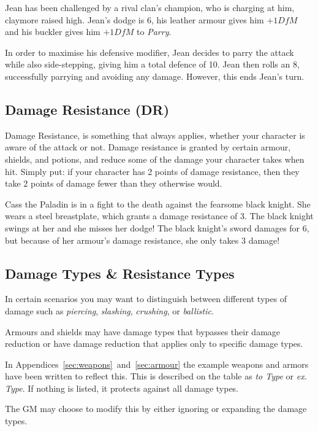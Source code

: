 \example Jean has been challenged by a rival clan's champion, who is charging at him, claymore raised high.
Jean's dodge is 6, his leather armour gives him $+1 \mathit{DfM}$ and his buckler gives him $+1 \mathit{DfM}$ to \textit{Parry}.

In order to maximise his defensive modifier, Jean decides to parry the attack while also side-stepping, giving him a total defence of 10.
Jean then rolls an 8, successfully parrying and avoiding any damage.
However, this ends Jean's turn.

\subsection{Damage Resistance (DR)}\label{sec:damage-resistance}
Damage Resistance, is something that always applies, whether your character is aware of the attack or not.
Damage resistance is granted by certain armour, shields, and potions, and reduce some of the damage your character takes when hit.
Simply put: if your character has 2 points of damage resistance, then they take 2 points of damage fewer than they otherwise would.

\example Cass the Paladin is in a fight to the death against the fearsome black knight.
She wears a steel breastplate, which grants a damage resistance of 3.
The black knight swings at her and she misses her dodge!
The black knight's sword damages for 6, but because of her armour's damage resistance, she only takes 3 damage!

\subsection{Damage Types \& Resistance Types}
In certain scenarios you may want to distinguish between different types of damage such as \textit{piercing}, \textit{slashing}, \textit{crushing}, or \textit{ballistic}.

Armours and shields may have damage types that bypasses their damage reduction or have damage reduction that applies only to specific damage types.

In Appendices~\ref{sec:weapons}~and~\ref{sec:armour} the example weapons and armors have been written to reflect this.
This is described on the table as \textit{to Type} or \textit{ex. Type}.
If nothing is listed, it protects against all damage types.

The GM may choose to modify this by either ignoring or expanding the damage types.